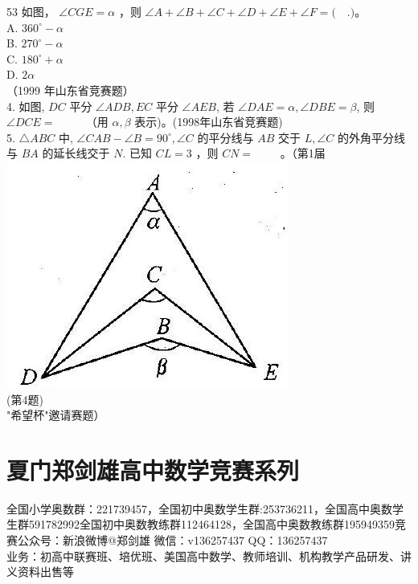 \documentclass[10pt]{article}
\begin{document}
53 如图， $\angle C G E=\alpha$ ，则 $\angle A+\angle B+\angle C+\angle D+\angle E+\angle F=(\quad$.$) 。$\\
A. $360^{\circ}-\alpha$\\
B. $270^{\circ}-\alpha$\\
C. $180^{\circ}+\alpha$\\
D. $2 \alpha$\\
（1999 年山东省竞赛题）\\
4. 如图, $D C$ 平分 $\angle A D B, E C$ 平分 $\angle A E B$, 若 $\angle D A E=\alpha, \angle D B E=\beta$, 则 $\angle D C E=$ $\qquad$ （用 $\alpha, \beta$ 表示)。(1998年山东省竞赛题)\\
5. $\triangle A B C$ 中, $\angle C A B-\angle B=90^{\circ}, \angle C$ 的平分线与 $A B$ 交于 $L, \angle C$ 的外角平分线与 $B A$ 的延长线交于 $N$. 已知 $C L=3$ ，则 $C N=$ $\qquad$。（第1届\\
\includegraphics[max width=\textwidth, center]{2024_10_30_2c8f45efd4a519b08e1ag-012(1)}\\
(第4题)\\
"希望杯"邀请赛题）

\section*{夏门郑剑雄高中数学竞赛系列}
全国小学奥数群：221739457，全国初中奥数学生群:253736211，全国高中奥数学生群591782992全国初中奥数教练群112464128，全国高中奥数教练群195949359竞赛公众号：新浪微博@郑剑雄 微信：v136257437 QQ：136257437\\
业务：初高中联赛班、培优班、美国高中数学、教师培训、机构教学产品研发、讲义资料出售等
\end{document}
